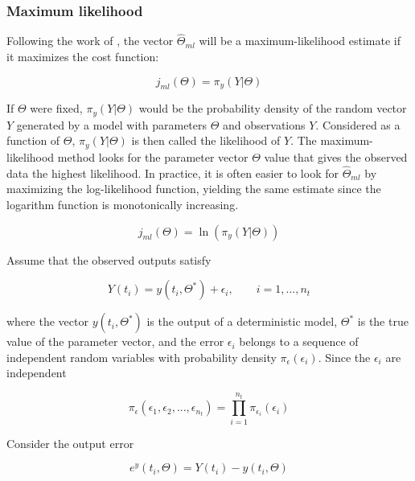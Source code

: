 \documentclass[../Article_Design_of_Experiment.tex]{subfiles}
\begin{document}
			
	\subsubsection{Maximum likelihood}

	Following the work of \citet{Walter2010}, the vector $\hat{\Theta}_{ml}$ will be a maximum-likelihood estimate if it maximizes the cost function:
	
	{\footnotesize
	\begin{equation}
		j_{ml}(\Theta) = \pi_y (Y|\Theta) 
	\end{equation} }
	
	If $\Theta$ were fixed, $\pi_y(Y|\Theta)$ would be the probability density of the random vector $Y$ generated by a model with parameters $\Theta$ and observations $Y$. Considered as a function of $\Theta$, $\pi_y(Y|\Theta)$ is then called the likelihood of $Y$. The maximum-likelihood method looks for the parameter vector $\Theta$ value that gives the observed data the highest likelihood. In practice, it is often easier to look for $\hat{\Theta}_{ml}$ by maximizing the log-likelihood function, yielding the same estimate since the logarithm function is monotonically increasing.
	
	{\footnotesize
	\begin{equation}
		j_{ml}(\Theta) = \ln ( \pi_y (Y|\Theta) )
	\end{equation} }
	
	Assume that the observed outputs satisfy 
	
	{\footnotesize
	\begin{equation}
		Y(t_i) = y(t_i, \Theta^*) + \epsilon_i, \qquad i=1,...,n_t
	\end{equation} }
	
	where the vector $y(t_i, \Theta^*)$ is the output of a deterministic model, $\Theta^*$ is the true value of the parameter vector, and the error $\epsilon_i$ belongs to a sequence of independent random variables with probability density $\pi_{\epsilon}(\epsilon_i)$. Since the $\epsilon_i$ are independent
	
	{\footnotesize
	\begin{equation}
		\pi_{\epsilon}(\epsilon_1, \epsilon_2, ..., \epsilon_{n_t}) = \prod_{i=1}^{n_t} \pi_{\epsilon_i}(\epsilon_i)
	\end{equation} }
	
	Consider the output error
	
	{\footnotesize
	\begin{equation} \label{EQ:Error_measurment}
		e^y(t_i, \Theta) = Y(t_i) - y(t_i, \Theta)
	\end{equation} }
	
\end{document}
